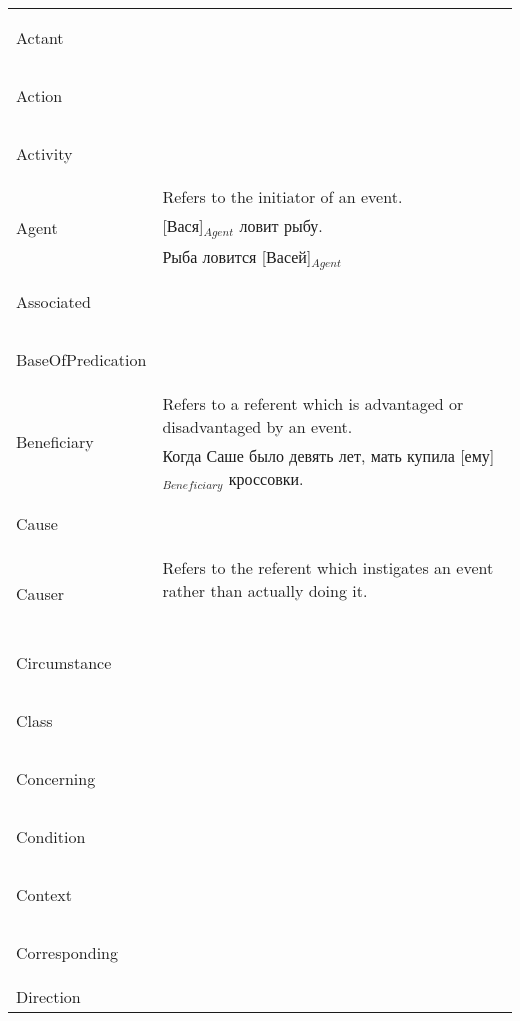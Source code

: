 \documentclass[a4paper,11pt, onecolumn,twoside]{article}
\begin{document}
\begin{longtable}{ p{}  p{} } 
\toprule
 \multirow{2}{*}{Actant} & ~ \\ 
        & ~ \\
\midrule
 \multirow{2}{*}{Action} & ~ \\ 
        & ~ \\
\midrule
 \multirow{2}{*}{Activity} & ~ \\ 
        & ~ \\
\midrule
 \multirow{3}{*}{Agent} & Refers to the initiator of an event. \\ 
        & [Вася]$_{Agent}$ ловит рыбу. \\
        & Рыба ловится [Васей]$_{Agent}$ \\
\midrule
 \multirow{2}{*}{Associated} & ~ \\ 
        & ~ \\
\midrule
 \multirow{2}{*}{BaseOfPredication} & ~ \\ 
        & ~ \\
\midrule
 \multirow{2}{*}{Beneficiary} & Refers to a referent which is advantaged or disadvantaged by an event. \\ 
        & Когда Саше было девять лет, мать купила [ему]$_{Beneficiary}$ кроссовки. \\
\midrule
 \multirow{2}{*}{Cause} & ~ \\ 
        & ~ \\
\midrule
 \multirow{2}{*}{Causer} & Refers to the referent which instigates an event rather than actually doing it. \\ 
        & ~ \\
\midrule
 \multirow{2}{*}{Circumstance} & ~ \\ 
        & ~ \\
\midrule
 \multirow{2}{*}{Class} & ~ \\ 
        & ~ \\
\midrule
 \multirow{2}{*}{Concerning} & ~ \\ 
        & ~ \\
\midrule
 \multirow{2}{*}{Condition} & ~ \\ 
        & ~ \\
\midrule
 \multirow{2}{*}{Context} & ~ \\ 
        & ~ \\
\midrule
 \multirow{2}{*}{Corresponding} & ~ \\ 
        & ~ \\
\midrule
 \multirow{2}{*}{Direction} & ~ \\ 

\end{longtable}
\end{document}

